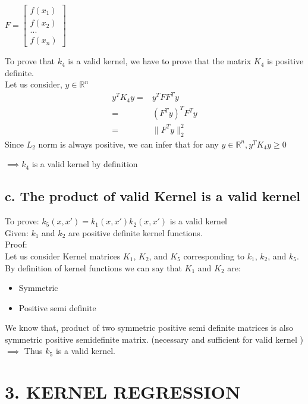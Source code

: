 \documentclass[letterpaper,doc,notimes]{apa6}
\begin{document}
  $F =  \begin{bmatrix}  f(x_1)\\ f(x_2) \\ ... \\ f(x_n) \end{bmatrix} $ 

To prove that $k_4$ is a valid kernel, we have to prove that the matrix $K_4$ is positive definite.\\

Let us consider, $y \in \mathbb{R}^n$ \\
\begin{align*}
y^T K_4 y = & y^T F F^T y \\
    =& (F^T y) ^T F^T y \\
    =& \parallel F^T y \parallel_2^2
\end{align*}
Since $L_2$ norm is always positive, we can infer that for any  $y \in \mathbb{R}^n, y^T K_4 y \ge 0$

$\implies k_4 $ is a valid kernel by definition

\subsection{c. The product of valid Kernel is a valid kernel}
To prove: $k_5(x, x') = k_1(x, x') k_2(x, x')$ is a valid kernel\\
Given: $k_1$ and $k_2$ are positive definite kernel functions.\\
Proof: \\
Let us consider Kernel matrices $K_1$, $K_2$, and $K_5$ corresponding to $k_1$, $k_2$, and $k_5$.
By definition of kernel functions we can say that $K_1$ and $K_2$ are:
\begin{itemize}
	\item Symmetric
	\item Positive semi definite
\end{itemize}
We know that, product of two symmetric positive semi definite matrices is also symmetric positive semidefinite matrix. (necessary and sufficient for valid kernel )\\
$\implies$ Thus $k_5$ is a valid kernel.

\section{3. KERNEL REGRESSION}
\end{document}
